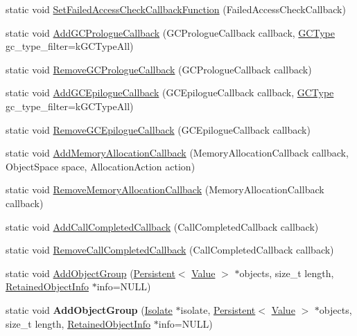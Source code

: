 \begin{DoxyCompactItemize}
\item 
static void \hyperlink{classv8_1_1_v8_aa6ed646d43360c209881871b3ac747aa}{Set\+Failed\+Access\+Check\+Callback\+Function} (Failed\+Access\+Check\+Callback)
\item 
static void \hyperlink{classv8_1_1_v8_a49c016f17c67f700387f801b2b29b5ab}{Add\+G\+C\+Prologue\+Callback} (G\+C\+Prologue\+Callback callback, \hyperlink{namespacev8_ac109d6f27e0c0f9ef4e98bcf7a806cf2}{G\+C\+Type} gc\+\_\+type\+\_\+filter=k\+G\+C\+Type\+All)
\item 
static void \hyperlink{classv8_1_1_v8_a7cdceb9c8ea5cd0887f69fd3bd97193f}{Remove\+G\+C\+Prologue\+Callback} (G\+C\+Prologue\+Callback callback)
\item 
static void \hyperlink{classv8_1_1_v8_a37aadf3536c772eb5bbf67fa7822679a}{Add\+G\+C\+Epilogue\+Callback} (G\+C\+Epilogue\+Callback callback, \hyperlink{namespacev8_ac109d6f27e0c0f9ef4e98bcf7a806cf2}{G\+C\+Type} gc\+\_\+type\+\_\+filter=k\+G\+C\+Type\+All)
\item 
static void \hyperlink{classv8_1_1_v8_a3382e4dae9865909242a8ee0b1d6bf77}{Remove\+G\+C\+Epilogue\+Callback} (G\+C\+Epilogue\+Callback callback)
\item 
static void \hyperlink{classv8_1_1_v8_ac9718f8dc3f3c498bf07282eb7c1618e}{Add\+Memory\+Allocation\+Callback} (Memory\+Allocation\+Callback callback, Object\+Space space, Allocation\+Action action)
\item 
static void \hyperlink{classv8_1_1_v8_a1e181f5bf42174b60cd5f4e3a0c20ce8}{Remove\+Memory\+Allocation\+Callback} (Memory\+Allocation\+Callback callback)
\item 
static void \hyperlink{classv8_1_1_v8_a3f70d920e58ac54b56f06363b5130fa3}{Add\+Call\+Completed\+Callback} (Call\+Completed\+Callback callback)
\item 
static void \hyperlink{classv8_1_1_v8_a551e1103c0d60a6dda8692a8b9b2db02}{Remove\+Call\+Completed\+Callback} (Call\+Completed\+Callback callback)
\item 
static void \hyperlink{classv8_1_1_v8_a1ff0fce14ab8124c60d3ff16a9a91c4c}{Add\+Object\+Group} (\hyperlink{classv8_1_1_persistent}{Persistent}$<$ \hyperlink{classv8_1_1_value}{Value} $>$ $\ast$objects, size\+\_\+t length, \hyperlink{classv8_1_1_retained_object_info}{Retained\+Object\+Info} $\ast$info=N\+U\+L\+L)
\item 
\hypertarget{classv8_1_1_v8_a661989b059af8490e635413289b95528}{}static void {\bfseries Add\+Object\+Group} (\hyperlink{classv8_1_1_isolate}{Isolate} $\ast$isolate, \hyperlink{classv8_1_1_persistent}{Persistent}$<$ \hyperlink{classv8_1_1_value}{Value} $>$ $\ast$objects, size\+\_\+t length, \hyperlink{classv8_1_1_retained_object_info}{Retained\+Object\+Info} $\ast$info=N\+U\+L\+L)\label{classv8_1_1_v8_a661989b059af8490e635413289b95528}


\end{DoxyCompactItemize}
